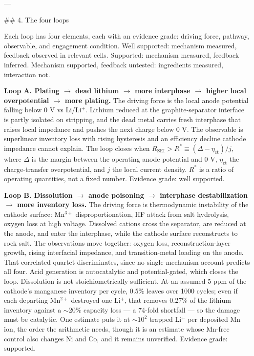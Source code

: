 ---

## 4. The four loops

Each loop has four elements, each with an evidence grade: driving force, pathway, observable, and engagement condition. Well supported: mechanism measured, feedback observed in relevant cells. Supported: mechanism measured, feedback inferred. Mechanism supported, feedback untested: ingredients measured, interaction not.

\textbf{Loop A. Plating $\rightarrow$ dead lithium $\rightarrow$ more interphase $\rightarrow$ higher local overpotential $\rightarrow$ more plating.} The driving force is the local anode potential falling below 0 V vs Li/Li$^{+}$. Lithium reduced at the graphite-separator interface is partly isolated on stripping, and the dead metal carries fresh interphase that raises local impedance and pushes the next charge below 0 V.\cite{hsieh2020quantification,vil2020nickel,betz2019cross} The observable is superlinear inventory loss with rising hysteresis and an efficiency decline cathode impedance cannot explain. The loop closes when $R_{\mathrm{SEI}} > R^{\ast} \equiv (\Delta-\eta_{\mathrm{ct}})/j$, where $\Delta$ is the margin between the operating anode potential and 0 V, $\eta_{\mathrm{ct}}$ the charge-transfer overpotential, and $j$ the local current density. $R^{\ast}$ is a ratio of operating quantities, not a fixed number. Evidence grade: well supported.

\textbf{Loop B. Dissolution $\rightarrow$ anode poisoning $\rightarrow$ interphase destabilization $\rightarrow$ more inventory loss.} The driving force is thermodynamic instability of the cathode surface: Mn$^{3+}$ disproportionation, HF attack from salt hydrolysis, oxygen loss at high voltage.\cite{tesfamhret2023role,sharifiasl2019oxygen,huang2021understanding} Dissolved cations cross the separator, are reduced at the anode, and enter the interphase, while the cathode surface reconstructs to rock salt. The observations move together: oxygen loss, reconstruction-layer growth, rising interfacial impedance, and transition-metal loading on the anode.\cite{tornheim2026quantifying,gilbert2017transition} That correlated quartet discriminates, since no single-mechanism account predicts all four. Acid generation is autocatalytic and potential-gated, which closes the loop. Dissolution is not stoichiometrically sufficient. At an assumed 5 ppm of the cathode's manganese inventory per cycle, 0.5\% leaves over 1000 cycles; even if each departing Mn$^{2+}$ destroyed one Li$^{+}$, that removes 0.27\% of the lithium inventory against a $\sim$20\% capacity loss --- a 74-fold shortfall --- so the damage must be catalytic. One estimate puts it at $\sim 10^{2}$ trapped Li$^{+}$ per deposited Mn ion, the order the arithmetic needs, though it is an estimate whose Mn-free control also changes Ni and Co, and it remains unverified.\cite{woodford2010electrochemical} Evidence grade: supported.

